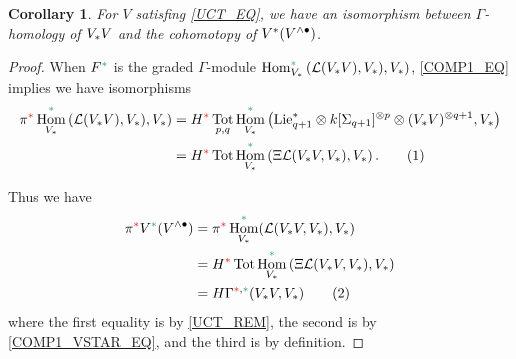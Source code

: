 \documentclass[11pt,reqno
,draft
]{amsart}
\numberwithin{equation}{section}
\numberwithin{figure}{section}
\newtheorem{corollary}[equation]{Corollary}%
\theoremstyle{definition} %
\DeclareMathOperator{\Hom}{Hom}%
\newcommand{\Ksi}{\Xi}
\newcommand{\Lie}{\mathrm{Lie}}
\newcommand{\Loday}{\mathcal L}
\newcommand{\redstar}{{\color{red}\**}}
\newcommand{\greenstar}{{\color{ForestGreen}\**}}
\DeclareMathOperator{\Tot}{Tot}
\begin{document}
\begin{corollary}
        \label{COMP_COR}
        For $V$ satisfing \cref{UCT_EQ},
        we have an isomorphism between $\Gamma$-homology of $V_{\**}V$ and the cohomotopy of $V^{\**}(V^{\wedge \bullet})$. %
\end{corollary}
\begin{proof}
        When $F^{\greenstar}$ is the graded $\Gamma$-module $\Hom^{\greenstar}_{V_{\**}}\left( \Loday(V_{\**}V), V_{\**}), V_{\**} \right)$,
        \cref{COMP1_EQ} implies we have isomorphisms
        \begin{align*}
          \pi^{\redstar} \Hom^{\greenstar}_{V_{\**}}\left( \Loday(V_{\**}V), V_{\**}), V_{\**} \right)
          & =
            H^{\redstar} \Tot_{p,q} \Hom^{\greenstar}_{V_{\**}} \left( \Lie_{q+1}^{\**} \otimes k[\Sigma_{q+1}]^{\otimes p} \otimes (V_{\**}V)^{\otimes q+1}, V_{\**} \right) \\
          & =
            H^{\redstar} \Tot \Hom^{\greenstar}_{V_{\**}} \left( \Ksi \Loday(V_{\**}V, V_{\**}), V_{\**} \right).
            \stepcounter{equation}\tag{\theequation}\label{COMP1_VSTAR_EQ}\\
        \end{align*}
        
        Thus we have
        \begin{align*}
          \pi^{\redstar} V^{\greenstar}(V^{\wedge \bullet})
          &= \pi^{\redstar} \Hom^{\greenstar}_{V_{\**}}(\Loday(V_{\**}V, V_{\**}), V_{\**}) \\
          &= H^{\redstar} \Tot \Hom^{\greenstar}_{V_{\**}}\left( \Ksi \Loday(V_{\**}V, V_{\**}), V_{\**} \right) \\
          &= H\Gamma^{\redstar, \greenstar}(V_{\**}V, V_{\**})
            \stepcounter{equation}\tag{\theequation}\label{COMP_EQ}\\
        \end{align*}
        where the first equality is by \cref{UCT_REM},
        the second is by \cref{COMP1_VSTAR_EQ},
        and the third is by definition.        
\end{proof}
\end{document}
